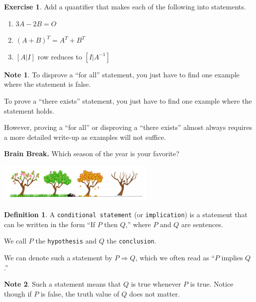 \documentclass[handout]{beamer}
\newcommand{\fn}{\insertframenumber}
\theoremstyle{definition}
\newtheorem{exercise}{Exercise}
\newtheorem*{defn}{Definition}
\newtheorem*{nb}{Note}
\renewcommand{\emph}[1]{{\color{blue}\texttt{#1}}}
\begin{document}
\begin{frame}{\fn}
	\begin{exercise}
		Add a quantifier that makes each of the following into statements.
		\begin{enumerate}[label=(\alph*)]
			\item $3A-2B=O$
			\item $(A+B)^{T}=A^T+B^T$
			\item $[A|I]$ row reduces to $[I|A^{-1}]$
		\end{enumerate}
	\end{exercise}
	\begin{nb}
		To disprove a ``for all'' statement, you just have to find one example where the statement is false.
		
		To prove a ``there exists'' statement, you just have to find one example where the statement holds.
		
		However, proving a ``for all'' or disproving a ``there exists'' almost always requires a more detailed write-up as examples will not suffice.
	\end{nb}
\end{frame}
\begin{frame}{\fn}
\begin{block}{\textbf{Brain Break.}}
	Which season of the year is your favorite?
	\begin{center}
		\includegraphics[width=3in]{images/seasons}
	\end{center}
\end{block}
\end{frame}
\begin{frame}{\fn}
	\begin{defn}
		A \emph{conditional statement} (or \emph{implication}) is a statement that can be written in the form ``If $P$ then $Q$,'' where $P$ and $Q$ are sentences. 
		
		We call $P$ the \emph{hypothesis} and $Q$ the \emph{conclusion}.
		
		We can denote such a statement by $P\Rightarrow Q$, which we often read as ``$P$ implies $Q$.''
	\end{defn}
	\begin{nb}
		Such a statement means that $Q$ is true whenever $P$ is true.  
		Notice though if $P$ is false, the truth value of $Q$ does not matter.
	\end{nb}
\end{frame}
\end{document}
